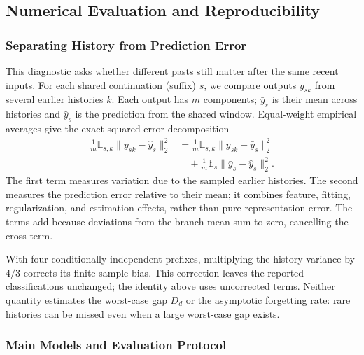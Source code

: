 \subsection{Numerical Evaluation and Reproducibility}
\label{sec:methods}

\subsubsection{Separating History from Prediction Error}
\label{app:common-suffix-diagnostic}

This diagnostic asks whether different pasts still matter after the same
recent inputs. For each shared continuation (suffix) $s$, we compare
outputs $y_{sk}$ from several earlier histories $k$. Each output has $m$
components; $\bar y_s$ is their mean across histories and $\widehat y_s$
is the prediction from the shared window. Equal-weight empirical averages
give the exact squared-error decomposition
\begin{equation}
 \begin{aligned}
 \frac1m\mathbb E_{s,k}\|y_{sk}-\widehat y_s\|_2^2
 &=\frac1m\mathbb E_{s,k}\|y_{sk}-\bar y_s\|_2^2\\
 &\quad+\frac1m\mathbb E_s\|\bar y_s-\widehat y_s\|_2^2 .
 \end{aligned}
 \label{eq:panel-decomposition}
\end{equation}
The first term measures variation due to the sampled earlier histories.
The second measures the prediction error relative to their mean; it
combines feature, fitting, regularization, and estimation effects, rather
than pure representation error. The terms add because deviations from
the branch mean sum to zero, cancelling the cross term.

With four conditionally independent prefixes, multiplying the history
variance by $4/3$ corrects its finite-sample bias. This correction leaves
the reported classifications unchanged; the identity above uses
uncorrected terms. Neither quantity estimates the worst-case gap $D_d$
or the asymptotic forgetting rate:
rare histories can be missed even when a large worst-case gap exists.

\subsubsection{Main Models and Evaluation Protocol}

